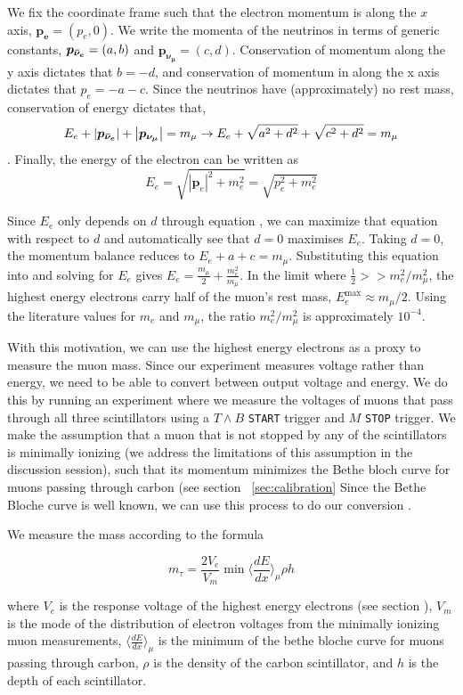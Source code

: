 \documentclass[aps,prb,twocolumn,superscriptaddress,floatfix,longbibliography,citeautoscript]{revtex4-2}
\begin{document}
We fix the coordinate frame such that the electron momentum is along the $x$ axis, $\boldsymbol{p_{e}} = (p_e, 0)$. We write the momenta of the neutrinos in terms of generic constants, $\boldsymbol{p_{\Bar{\nu}_e}} = (a, b)$ and $\boldsymbol{p_{{\nu}_\mu}} = (c, d)$. Conservation of momentum along the y axis dictates that $b=-d$, and conservation of momentum in along the x axis dictates that $p_e = -a - c$. Since the neutrinos have (approximately) no rest mass, conservation of energy dictates that, $$E_e + \left| \boldsymbol{p_{\Bar{\nu}_e}}\right| + \left|\boldsymbol{p_{{\nu}_\mu}} \right| = m_\mu \to E_e + \sqrt{a^2 + d^2} + \sqrt{c^2 + d^2} = m_\mu$$. Finally, the energy of the electron can be written as $$E_e = \sqrt{\left|\boldsymbol{p}_e\right|^2 + m_e^2} = \sqrt{p_e^2 + m_e^2} $$

Since $E_e$ only depends on $d$ through equation , we can maximize that equation with respect to $d$ and automatically see that $d = 0$ maximises $E_e$. Taking $d = 0$, the momentum balance reduces to $E_e +a+c = m_\mu$. Substituting this equation into  and solving for $E_e$ gives $E_e = \frac{m_\mu}{2} + \frac{m_e^2}{m_\mu}$. In the limit where $ \frac{1}{2} >> m_e^2/m_\mu^2$, the highest energy electrons carry half of the muon's rest mass, $E_e^{\text{max}} \approx m_\mu / 2$. Using the literature values for $m_e$ and $m_\mu$, the ratio $m_e^2/m_\mu^2$ is approximately $10^{-4}$.

With this motivation, we can use the highest energy electrons as a proxy to measure the muon mass. Since our experiment measures voltage rather than energy, we need to be able to convert between output voltage and energy. We do this by running an experiment where we measure the voltages of muons that pass through all three scintillators using a $T\wedge B$ \texttt{START} trigger and $M$ \texttt{STOP} trigger. We make the assumption that a muon that is not stopped by any of the scintillators is minimally ionizing (we address the limitations of this assumption in the discussion session), such that its momentum minimizes the Bethe bloch curve for muons passing through carbon (see section ~\ref{sec:calibration} Since the Bethe Bloche curve is well known, we can use this process to do our conversion .

We measure the mass according to the formula

$$m_{\tau} = \frac{2V_e}{V_m}\min\langle \frac{dE}{dx}\rangle_{\mu} \rho h$$

where $V_e$ is the response voltage of the highest energy electrons (see section ), $V_m$ is the mode of the distribution of electron voltages from the minimally ionizing muon measurements, $\langle\frac{dE}{dx}\rangle_{\mu}$ is the minimum of the bethe bloche curve for muons passing through carbon, $\rho$ is the density of the carbon scintillator, and $h$ is the depth of each scintillator.
\end{document}
